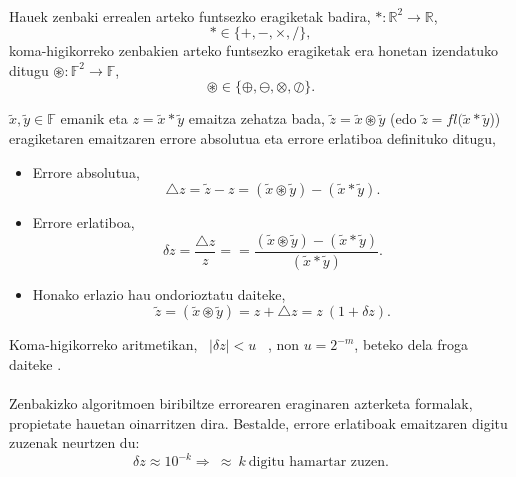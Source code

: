 \paragraph*{} Hauek zenbaki errealen arteko funtsezko eragiketak badira,  $\ast: \mathbb{R}^2\rightarrow \mathbb{R}$, 
\begin{equation*}
\ast\in \{+,-,\times,/ \},
\end{equation*}
koma-higikorreko zenbakien arteko funtsezko eragiketak era honetan izendatuko ditugu  $\circledast: \mathbb{F}^2\rightarrow \mathbb{F}$,
\begin{equation*}
\circledast\in \{\oplus,\ominus,\otimes,\oslash \}.
\end{equation*}

$\tilde x,\tilde y \in \mathbb{F}$ emanik eta $z= \tilde x \ast \tilde y$ emaitza zehatza bada, $\tilde z= \tilde x \circledast \tilde y$ (edo $\tilde z= fl(\tilde x \ast \tilde y$)) eragiketaren emaitzaren errore absolutua eta errore erlatiboa definituko ditugu,

\begin{itemize}
\item Errore absolutua,
\begin{equation*}
\triangle z=\tilde z-z =(\tilde x \circledast \tilde y) -(\tilde x \ast \tilde y).
\end{equation*} 
\item Errore erlatiboa,
\begin{equation*}
\delta z=\frac{\triangle z}{z}==\frac{(\tilde x \circledast \tilde y) -(\tilde x \ast \tilde y)}{(\tilde x \ast \tilde y)}.
\end{equation*} 
\item Honako erlazio hau ondorioztatu daiteke,
\begin{equation*}
\tilde z=(\tilde x \circledast \tilde y)=z+\triangle z=z \ (1+\delta z).  
\end{equation*}
\end{itemize}

Koma-higikorreko aritmetikan, \ $|\delta z|<u$ \ , non  $u=2^{-m}$, beteko dela froga daiteke \cite{Corless2013}.

\paragraph*{} Zenbakizko algoritmoen biribiltze errorearen eraginaren azterketa formalak, propietate hauetan oinarritzen dira. Bestalde, errore erlatiboak emaitzaren digitu zuzenak neurtzen du:
\begin{equation*}
\delta z \approx 10^{-k} \Rightarrow \ \approx \ k \ \mbox{digitu hamartar zuzen}.
\end{equation*}  


